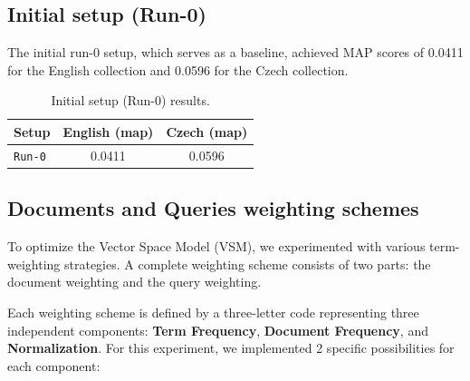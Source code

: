 \documentclass[a4paper, 12pt]{article}
\begin{document}
\subsection{Initial setup (Run-0)}

The initial run-0 setup, which serves as a baseline, achieved MAP scores of 0.0411 for the English collection and 0.0596 for the Czech collection.

\begin{table}[H]
    \centering
    \begin{tabular}[t]{p{3cm}cc} 
        \hline
        \textbf{Setup} & \textbf{English} (map) & \textbf{Czech} (map) \\ 
        \hline
        \texttt{Run-0} & 0.0411 & 0.0596 \\
        \hline
    \end{tabular}
    \caption{Initial setup (Run-0) results.}
    \label{tab:run0_results}
\end{table}

\subsection{Documents and Queries weighting schemes}

To optimize the Vector Space Model (VSM), we experimented with various term-weighting strategies.
A complete weighting scheme consists of two parts: the document weighting and the query weighting. 

Each weighting scheme is defined by a three-letter code representing three independent components: \textbf{Term Frequency}, \textbf{Document Frequency}, and \textbf{Normalization}.
For this experiment, we implemented 2 specific possibilities for each component:
\end{document}
